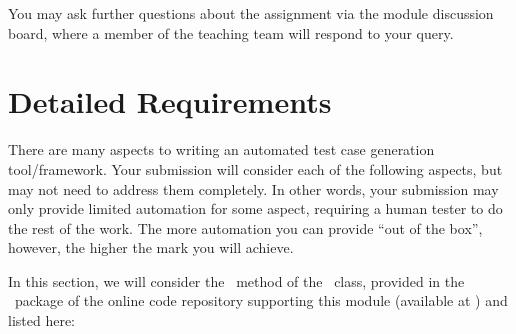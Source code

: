 You may ask further questions about the assignment via the module discussion
board, where a member of the teaching team will respond to your query.


\section{Detailed Requirements}
\label{sec:requirements}

There are many aspects to writing an automated test case generation
tool/framework. Your submission will consider each of the following aspects, but
may not need to address them completely. In other words, your submission may
only provide limited automation for some aspect, requiring a human tester to do
the rest of the work. The more automation you can provide ``out of the box'',
however, the higher the mark you will achieve. 

In this section, we will consider the \calculatemethod~method of the
\bmicalculatorclass~class, provided in the \practicalspackage~package of the
online code repository supporting this module (available at \coderepourl) and
listed here:

